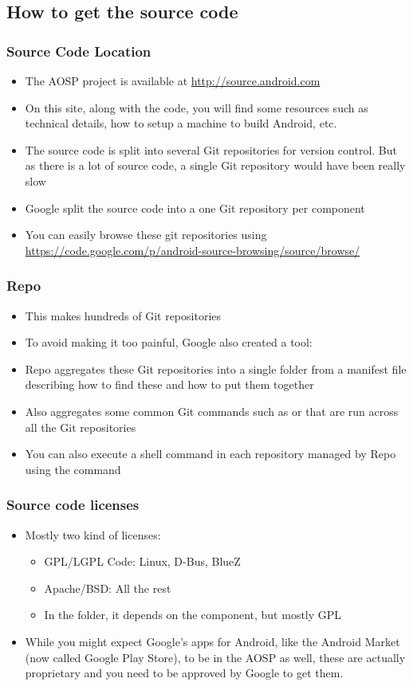 \subsection{How to get the source code}
\begin{frame}
  \frametitle{Source Code Location}
  \begin{itemize}
  \item The AOSP project is available at
    \url{http://source.android.com}
  \item On this site, along with the code, you will find some resources
    such as technical details, how to setup a machine to build
    Android, etc.
  \item The source code is split into several Git repositories for
    version control. But as there is a lot of source code, a single
    Git repository would have been really slow
  \item Google split the source code into a one Git repository per
    component
  \item You can easily browse these git repositories using
    \url{https://code.google.com/p/android-source-browsing/source/browse/}
  \end{itemize}
\end{frame}

\begin{frame}
  \frametitle{Repo}
  \begin{itemize}
  \item This makes hundreds of Git repositories\!
  \item To avoid making it too painful, Google also created a tool:
  \item Repo aggregates these Git repositories into a single folder
    from a manifest file describing how to find these and how to put
    them together
  \item Also aggregates some common Git commands such as 
    or  that are run across all the Git repositories
  \item You can also execute a shell command in each repository
    managed by Repo using the  command
  \end{itemize}
\end{frame}

\begin{frame}
  \frametitle{Source code licenses}
  \begin{itemize}
  \item Mostly two kind of licenses:
    \begin{itemize}
    \item GPL/LGPL Code: Linux, D-Bus, BlueZ
    \item Apache/BSD: All the rest
    \item In the  folder, it depends on the component,
      but mostly GPL
    \end{itemize}
  \item While you might expect Google's apps for Android, like the
    Android Market (now called Google Play Store), to be in the AOSP
    as well, these are actually proprietary and you need to be
    approved by Google to get them.
  \end{itemize}
\end{frame}
